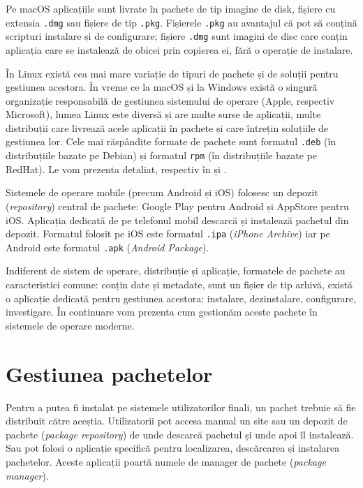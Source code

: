 Pe macOS aplicațiile sunt livrate în pachete de tip imagine de disk, fișiere cu extensia \texttt{.dmg} sau fișiere de tip \texttt{.pkg}.
Fișierele \texttt{.pkg} au avantajul că pot să conțină scripturi instalare și de configurare;
fișiere \texttt{.dmg} sunt imagini de disc care conțin aplicația care se instalează de obicei prin copierea ei, fără o operație de instalare.

În Linux există cea mai mare variație de tipuri de pachete și de soluții pentru gestiunea acestora.
În vreme ce la macOS și la Windows există o singură organizație responsabilă de gestiunea sistemului de operare (Apple, respectiv Microsoft), lumea Linux este diversă și are multe surse de aplicații, multe distribuții care livrează acele aplicații în pachete și care întrețin soluțiile de gestiunea lor.
Cele mai răspândite formate de pachete sunt formatul \texttt{.deb} (în distribuțiile bazate pe Debian) și formatul \texttt{rpm} (în distribuțiile bazate pe RedHat).
Le vom prezenta detaliat, respectiv în  și .

Sistemele de operare mobile (precum Android și iOS) folosesc un depozit (\textit{repository}) central de pachete: Google Play pentru Android și AppStore pentru iOS.
Aplicația dedicată de pe telefonul mobil descarcă și instalează pachetul din depozit.
Formatul folosit pe iOS este formatul \texttt{.ipa} (\textit{iPhone Archive}) iar pe Android este formatul \texttt{.apk} (\textit{Android Package}).

Indiferent de sistem de operare, distribuție și aplicație, formatele de pachete au caracteristici comune: conțin date și metadate, sunt un fișier de tip arhivă, există o aplicație dedicată pentru gestiunea acestora: instalare, dezinstalare, configurare, investigare.
În continuare vom prezenta cum gestionăm aceste pachete în sistemele de operare moderne.

\section{Gestiunea pachetelor}
\label{sec:package:manage}

Pentru a putea fi instalat pe sistemele utilizatorilor finali, un pachet trebuie să fie distribuit către aceștia.
Utilizatorii pot accesa manual un site sau un depozit de pachete (\textit{package repository}) de unde descarcă pachetul și unde apoi îl instalează.
Sau pot folosi o aplicație specifică pentru localizarea, descărcarea și instalarea pachetelor.
Aceste aplicații poartă numele de manager de pachete (\textit{package manager}).

